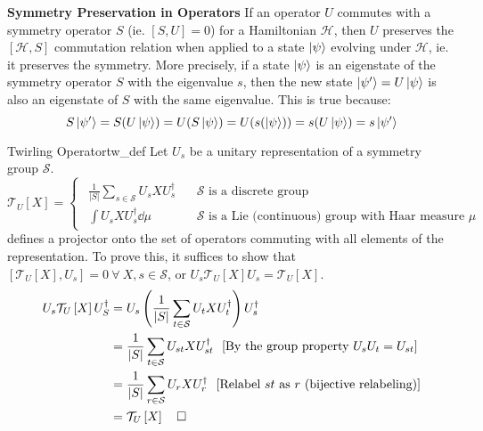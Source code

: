 \documentclass{article}
\newcommand{\qed}{\hfill\square}
\newcommand{\twirl}[2]{\mathcal{T}_{#1}\left[#2\right]}
\newcommand{\hamiltonian}{\mathcal{H}}
\newcommand{\sym}{\mathcal{S}}
\begin{document}
	\textbf{Symmetry Preservation in Operators}
	If an operator $U$ commutes with a symmetry operator $S$ (ie. $[S, U] = 0$) for a Hamiltonian $\hamiltonian$, then $U$ preserves the $[\hamiltonian, S]$ commutation relation when applied to a state $\ket{\psi}$ evolving under $\hamiltonian$, ie. it preserves the symmetry. More precisely, if a state $\ket{\psi}$ is an eigenstate of the symmetry operator $S$ with the eigenvalue $s$, then the new state $\ket{\psi'} = U\ket{\psi}$ is also an eigenstate of $S$ with the same eigenvalue. This is true because: $$S\ket{\psi'} = S(U\ket{\psi}) = U(S\ket{\psi}) = U(s(\ket{\psi})) = s(U\ket{\psi}) = s\ket{\psi'}$$
	\vspace{0.1ex}
	
	\begin{definition}{Twirling Operator}{tw_def}
		Let $U_s$ be a unitary representation of a symmetry group $\sym$. \begin{equation}\twirl{U}{X} = \begin{cases}\begin{aligned}
					\frac{1}{|S|}\sum_{s \in \sym}U_sXU_s^\dagger & ~~~~\sym \text{ is a discrete group}\\
					\int U_sXU_s^\dagger \dd{\mu} & ~~~~ \sym \text{ is a Lie (continuous) group with Haar measure $\mu$}
				\end{aligned}
		\end{cases}\end{equation}
		defines a projector onto the set of operators commuting with all elements of the representation.\cite{meyerExploitingSymmetryVariational2023}
		To prove this, it suffices to show that $[\twirl{U}{X}, U_s] = 0 ~\forall~ X, s \in \sym$, or $U_s \twirl{U}{X}U_s = \twirl{U}{X}$. 
		\begin{equation}
			\begin{split}
				U_s\twirl{U}{X}U_S^\dagger &= U_s\left(\frac{1}{|S|}\sum_{t \in \sym}U_tXU_t^\dagger\right)U_s^\dagger\\
				&= \frac{1}{|S|}\sum_{t \in \sym}U_{st}XU_{st}^\dagger ~~\text{[By the group property $U_sU_t = U_{st}$]}\\
				&= \frac{1}{|S|}\sum_{r \in \sym}U_{r}XU_{r}^\dagger ~~\text{[Relabel $st$ as $r$ (bijective relabeling)]}\\
				&= \twirl{U}{X} ~~~\qed
			\end{split}
		\end{equation}
		
	\end{definition}
	
\end{document}
